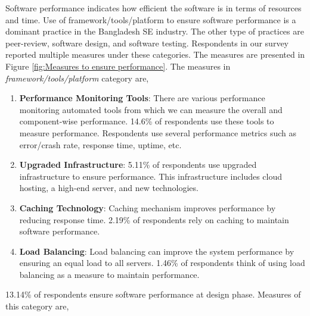 Software performance indicates how efficient the software is in terms of resources and time. Use of framework/tools/platform to ensure software performance is a dominant practice in the Bangladesh SE industry. The other type of practices are peer-review, software design, and software testing. Respondents in our survey reported multiple measures under these categories.
The measures are presented in Figure \ref{fig:Measures to ensure performance}. The measures in \emph{framework/tools/platform} category are,
\begin{enumerate}[label=(\alph*)]

    
    \item \textbf{Performance Monitoring Tools}: There are various performance monitoring automated tools from which we can measure the overall and component-wise performance. 14.6\% of respondents use these tools to measure performance. Respondents use several performance metrics such as error/crash rate, response time, uptime, etc.
    
    \item \textbf{Upgraded Infrastructure}: 5.11\% of respondents use upgraded infrastructure to ensure performance. This infrastructure includes cloud hosting, a high-end server, and new technologies.
    
    \item \textbf{Caching Technology}: Caching mechanism improves performance by reducing response time. 2.19\% of respondents rely on caching to maintain software performance.
    
    \item \textbf{Load Balancing}: Load balancing can improve the system performance by ensuring an equal load to all servers. 1.46\% of respondents think of using load balancing as a measure to maintain performance.

\end{enumerate}


13.14\% of respondents ensure software performance  at design phase. Measures of this category are,

